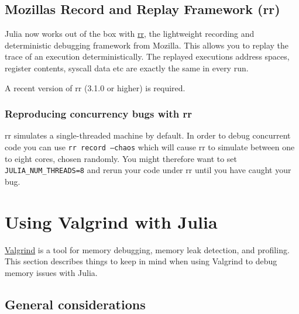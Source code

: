 \hypertarget{2874239207045478266}{}


\subsection{Mozilla{\textquotesingle}s Record and Replay Framework (rr)}



Julia now works out of the box with \href{https://rr-project.org/}{rr}, the lightweight recording and deterministic debugging framework from Mozilla. This allows you to replay the trace of an execution deterministically.  The replayed execution{\textquotesingle}s address spaces, register contents, syscall data etc are exactly the same in every run.



A recent version of rr (3.1.0 or higher) is required.



\hypertarget{8199500901675456324}{}


\subsubsection{Reproducing concurrency bugs with rr}



rr simulates a single-threaded machine by default. In order to debug concurrent code you can use \texttt{rr record --chaos} which will cause rr to simulate between one to eight cores, chosen randomly. You might therefore want to set \texttt{JULIA\_NUM\_THREADS=8} and rerun your code under rr until you have caught your bug.



\hypertarget{3182145831135367960}{}


\section{Using Valgrind with Julia}



\href{https://valgrind.org/}{Valgrind} is a tool for memory debugging, memory leak detection, and profiling.  This section describes things to keep in mind when using Valgrind to debug memory issues with Julia.



\hypertarget{527857279218691176}{}


\subsection{General considerations}



